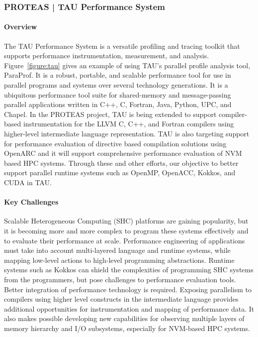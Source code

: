 \subsubsection{PROTEAS | TAU Performance System}\label{subsubsect:tau}

\paragraph{Overview} 
The TAU Performance System is a versatile profiling and tracing toolkit that supports performance instrumentation, measurement, and analysis.  Figure~\ref{figure:tau} gives an example of using TAU's parallel profile analysis tool, ParaProf. It is a robust, portable, and scalable performance tool for use in parallel programs and systems over several technology generations. It is a ubiquitous performance tool suite for shared-memory and message-passing parallel applications written in C++, C, Fortran, Java, Python, UPC, and Chapel. In the PROTEAS project, TAU is being extended to support compiler-based instrumentation for the LLVM C, C++, and Fortran compilers using higher-level intermediate language representation. TAU is also targeting support for performance evaluation of directive based compilation solutions using OpenARC and it will support comprehensive performance evaluation of NVM based HPC systems.  Through these and other efforts, our objective to better support parallel runtime systems such as OpenMP, OpenACC, Kokkos, and CUDA in TAU. 

\paragraph{Key Challenges} 
Scalable Heterogeneous Computing (SHC) platforms are gaining popularity, but it is becoming more and more complex to program these systems effectively and to evaluate their performance at scale. Performance engineering of applications must take into account multi-layered language and runtime systems, while mapping low-level actions to high-level programming abstractions.  Runtime systems such as Kokkos can shield the complexities of programming SHC systems from the programmers, but pose challenges to performance evaluation tools.  Better integration of performance technology is required.  Exposing parallelism to compilers using higher level constructs in the intermediate language provides additional opportunities for instrumentation and mapping of performance data.  It also makes possible developing new capabilities for observing multiple layers of memory hierarchy and I/O subsystems, especially for NVM-based HPC systems. 

